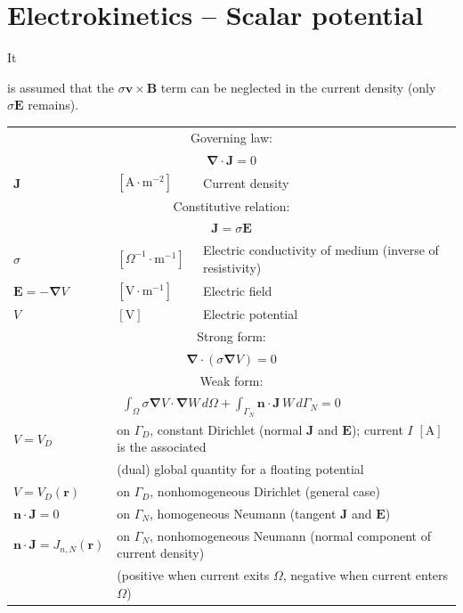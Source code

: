 \documentclass[letterpaper]{article}
\newcommand{\vect}[1]{\mathbf#1}
\newcommand{\nab}{\vect{\nabla}}
\begin{document}
\clearpage
\section{Electrokinetics -- Scalar potential}
\label{sec_ksp}

\hypertarget{sec_ksp}{It} is assumed that the $\sigma\vect{v}\times\vect{B}$ term can be neglected in the current density (only $\sigma\vect{E}$ remains).

\begin{table}[h!]
\centering
\begin{tabular}{lll}
\hline
\multicolumn{3}{c}{Governing law:} \\
\multicolumn{3}{c}{$\nab\cdot\vect{J}=0$}\\
$\vect{J}$ & $[\text{A}\cdot \text{m}^{-2}]$ & Current density\\
\hline

\multicolumn{3}{c}{Constitutive relation:} \\
\multicolumn{3}{c}{ $\vect{J}=\sigma\vect{E}$}\\
$\sigma$ & $[\Omega^{-1} \cdot \text{m}^{-1}]$ & Electric conductivity of medium (inverse of resistivity)\\ %
$\vect{E}=-\nab V$ & $[\text{V}\cdot \text{m}^{-1}]$ & Electric field\\
$V$ & $[\text{V}]$ & Electric potential\\
\hline

\multicolumn{3}{c}{Strong form:} \\
\multicolumn{3}{c}{$\nab\cdot\left(\sigma\nab V\right)=0$}\\
\hline

\multicolumn{3}{c}{Weak form:} \\[1pt]
\multicolumn{3}{c}{$\displaystyle\int_\Omega\sigma\nab V\cdot\nab W\,d\Omega+
\int_{\Gamma_N}\vect{n}\cdot\vect{J}\,W\,d{\Gamma_N}=0$}\\[8pt]
$V=V_D$ & \multicolumn{2}{l}{on $\Gamma_D$, constant Dirichlet (normal $\vect{J}$ and $\vect{E}$); current $I$ $[\text{A}]$ is the associated}\\
 & \multicolumn{2}{l}{(dual) global quantity for a floating potential}\\
$V=V_D(\vect{r})$ & \multicolumn{2}{l}{on $\Gamma_D$, nonhomogeneous Dirichlet (general case)}\\
$\vect{n}\cdot\vect{J}=0$ & \multicolumn{2}{l}{on $\Gamma_N$, homogeneous Neumann (tangent $\vect{J}$ and $\vect{E}$)}\\
$\vect{n}\cdot\vect{J}=J_{n,N}(\vect{r})$ & \multicolumn{2}{l}{on $\Gamma_N$, nonhomogeneous Neumann (normal component of current density)}\\
 & \multicolumn{2}{l}{(positive when current exits $\Omega$, negative when current enters $\Omega$)}\\
 

\end{tabular}
\end{table}
\end{document}
